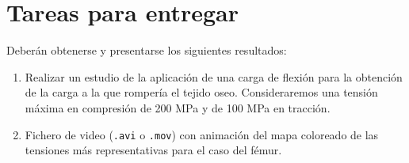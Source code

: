 \clearpage
\section{Tareas para entregar}
\label{sec:tareas}

Deberán obtenerse y presentarse los siguientes resultados:
\begin{enumerate}
	\item
	Realizar un estudio de la aplicación de una carga de flexión para la obtención de la carga a la que rompería el tejido oseo. Consideraremos una tensión máxima en compresión de 200 MPa y de 100 MPa en tracción.
	
	\item
	Fichero de video (\texttt{.avi} o \texttt{.mov}) con animación del mapa coloreado de las tensiones más representativas para el caso del fémur.
\end{enumerate}
